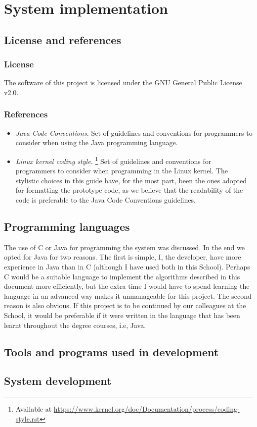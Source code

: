 \renewcommand{\documentname}{System implementation}

\chapter{System implementation}


\section{License and references}

\subsection{License}

The software of this project is licensed under the GNU General Public License v2.0.

\subsection{References}

\begin{itemize}
    \item \textit{Java Code Conventions.} Set of guidelines and conventions for programmers to consider when using the Java programming language.

    \item \textit{Linux kernel coding style.} \footnote{Available at \url{https://www.kernel.org/doc/Documentation/process/coding-style.rst}} Set of guidelines and conventions for programmers to consider when programming in the Linux kernel. The stylistic choices in this guide have, for the most part, been the ones adopted for formatting the prototype code, as we believe that the readability of the code is preferable to the Java Code Conventions guidelines.
\end{itemize}



\section{Programming languages}

The use of C or Java for programming the system was discussed. In the end we opted for Java for two reasons. The first is simple, I, the developer, have more experience in Java than in C (although I have used both in this School). Perhaps C would be a suitable language to implement the algorithms described in this document more efficiently, but the extra time I would have to spend learning the language in an advanced way makes it unmanageable for this project. The second reason is also obvious. If this project is to be continued by our colleagues at the School, it would be preferable if it were written in the language that has been learnt throughout the degree courses, i.e, Java.

\section{Tools and programs used in development}

\section{System development}

